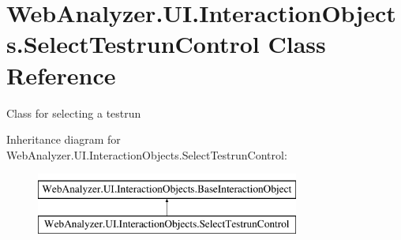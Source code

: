 \hypertarget{class_web_analyzer_1_1_u_i_1_1_interaction_objects_1_1_select_testrun_control}{}\section{Web\+Analyzer.\+U\+I.\+Interaction\+Objects.\+Select\+Testrun\+Control Class Reference}
\label{class_web_analyzer_1_1_u_i_1_1_interaction_objects_1_1_select_testrun_control}


Class for selecting a testrun  


Inheritance diagram for Web\+Analyzer.\+U\+I.\+Interaction\+Objects.\+Select\+Testrun\+Control\+:\begin{figure}[H]
\begin{center}
\leavevmode
\includegraphics[height=2.000000cm]{class_web_analyzer_1_1_u_i_1_1_interaction_objects_1_1_select_testrun_control}
\end{center}
\end{figure}
